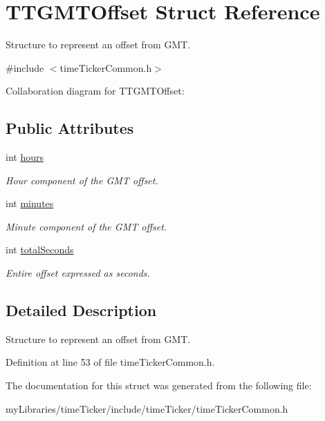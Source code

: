 \hypertarget{structTTGMTOffset}{}\section{T\+T\+G\+M\+T\+Offset Struct Reference}
\label{structTTGMTOffset}


Structure to represent an offset from G\+MT.  




{\ttfamily \#include $<$time\+Ticker\+Common.\+h$>$}



Collaboration diagram for T\+T\+G\+M\+T\+Offset\+:
\subsection*{Public Attributes}
\begin{DoxyCompactItemize}
\item 
\mbox{\label{structTTGMTOffset_a8f75d761742f056afa7df6c1a7782426}} 
int \mbox{\hyperlink{structTTGMTOffset_a8f75d761742f056afa7df6c1a7782426}{hours}}
\begin{DoxyCompactList}\small\item\em Hour component of the G\+MT offset. \end{DoxyCompactList}\item 
\mbox{\label{structTTGMTOffset_a868ca930d59b3a63e341cc07298e7499}} 
int \mbox{\hyperlink{structTTGMTOffset_a868ca930d59b3a63e341cc07298e7499}{minutes}}
\begin{DoxyCompactList}\small\item\em Minute component of the G\+MT offset. \end{DoxyCompactList}\item 
\mbox{\label{structTTGMTOffset_adadd2d89b26cfeffbd8ce8a09353b571}} 
int \mbox{\hyperlink{structTTGMTOffset_adadd2d89b26cfeffbd8ce8a09353b571}{total\+Seconds}}
\begin{DoxyCompactList}\small\item\em Entire offset expressed as seconds. \end{DoxyCompactList}\end{DoxyCompactItemize}


\subsection{Detailed Description}
Structure to represent an offset from G\+MT. 

Definition at line 53 of file time\+Ticker\+Common.\+h.



The documentation for this struct was generated from the following file\+:\begin{DoxyCompactItemize}
\item 
my\+Libraries/time\+Ticker/include/time\+Ticker/time\+Ticker\+Common.\+h\end{DoxyCompactItemize}
